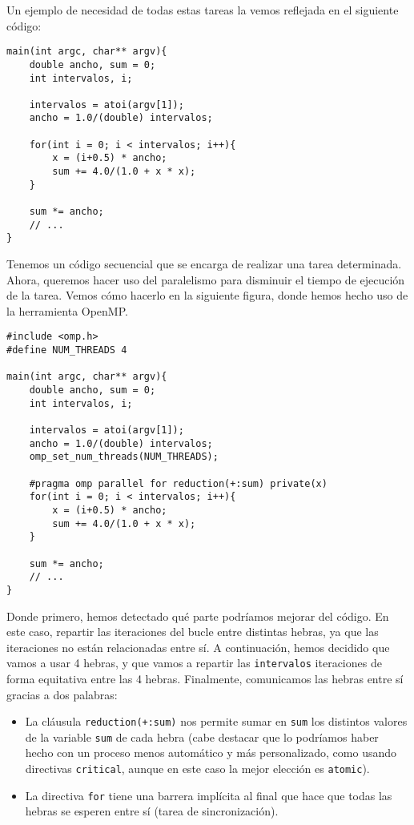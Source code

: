 Un ejemplo de necesidad de todas estas tareas la vemos reflejada en el siguiente código:
    \begin{verbatim}
main(int argc, char** argv){
    double ancho, sum = 0;
    int intervalos, i;
    
    intervalos = atoi(argv[1]);
    ancho = 1.0/(double) intervalos;

    for(int i = 0; i < intervalos; i++){
        x = (i+0.5) * ancho;
        sum += 4.0/(1.0 + x * x);
    }

    sum *= ancho;
    // ...
}
    \end{verbatim}
\label{codigo_pi}
Tenemos un código secuencial que se encarga de realizar una tarea determinada. Ahora, queremos hacer uso del paralelismo para disminuir el tiempo de ejecución de la tarea. Vemos cómo hacerlo en la siguiente figura, donde hemos hecho uso de la herramienta OpenMP.
    \begin{verbatim}
#include <omp.h>
#define NUM_THREADS 4

main(int argc, char** argv){
    double ancho, sum = 0;
    int intervalos, i;
    
    intervalos = atoi(argv[1]);
    ancho = 1.0/(double) intervalos;
    omp_set_num_threads(NUM_THREADS);

    #pragma omp parallel for reduction(+:sum) private(x)
    for(int i = 0; i < intervalos; i++){
        x = (i+0.5) * ancho;
        sum += 4.0/(1.0 + x * x);
    }

    sum *= ancho;
    // ...
}
    \end{verbatim}
Donde primero, hemos detectado qué parte podríamos mejorar del código. En este caso, repartir las iteraciones del bucle entre distintas hebras, ya que las iteraciones no están relacionadas entre sí. A continuación, hemos decidido que vamos a usar 4 hebras, y que vamos a repartir las \verb|intervalos| iteraciones de forma equitativa entre las 4 hebras. Finalmente, comunicamos las hebras entre sí gracias a dos palabras:
\begin{itemize}
    \item La cláusula \verb|reduction(+:sum)| nos permite sumar en \verb|sum| los distintos valores de la variable \verb|sum| de cada hebra (cabe destacar que lo podríamos haber hecho con un proceso menos automático y más personalizado, como usando directivas \verb|critical|, aunque en este caso la mejor elección es \verb|atomic|).
    \item La directiva \verb|for| tiene una barrera implícita al final que hace que todas las hebras se esperen entre sí (tarea de sincronización).
\end{itemize}

